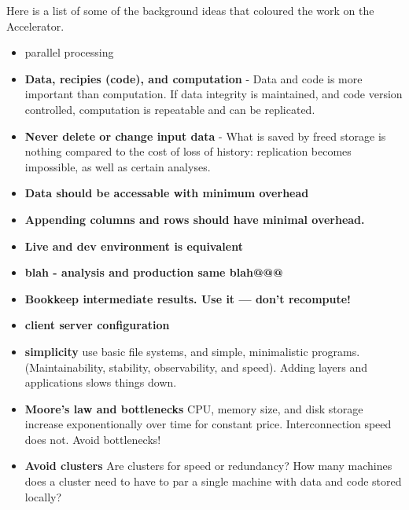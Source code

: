 \documentclass[a4paper]{report}
\begin{document}
\newpage
Here is a list of some of the background ideas that coloured the work
on the Accelerator.
\begin{itemize}

\item{parallel processing}
  
\item \textbf{Data, recipies (code), and computation} - Data and code
  is more important than computation.  If data integrity is
  maintained, and code version controlled, computation is repeatable
  and can be replicated.

\item \textbf{Never delete or change input data} - What is saved by
  freed storage is nothing compared to the cost of loss of history:
  replication becomes impossible, as well as certain analyses.

\item \textbf{Data should be accessable with minimum overhead}

\item \textbf{Appending columns and rows should have minimal overhead.}

\item \textbf{Live and dev environment is equivalent}
\item \textbf{ blah - analysis and production same blah@@@}
  
\item \textbf{Bookkeep intermediate results.  Use it --- don't recompute!}

\item \textbf{client server configuration}

\item \textbf{simplicity} use basic file systems, and simple,
  minimalistic programs.  (Maintainability, stability, observability,
  and speed).  Adding layers and applications slows things down.

\item \textbf{Moore's law and bottlenecks} CPU, memory size, and disk
  storage increase exponentionally over time for constant price.
  Interconnection speed does not.  Avoid bottlenecks!

\item \textbf{Avoid clusters} Are clusters for speed or redundancy?
  How many machines does a cluster need to have to par a single
  machine with data and code stored locally?
\end{itemize}
\end{document}
